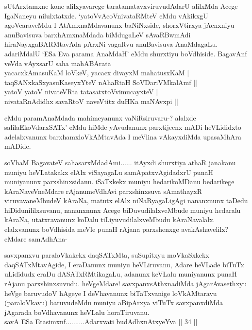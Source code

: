 \begin{artha}
sUtArxtamxne kone alilxyavarege taratamatavxviruvudAdarU alilxMda Acege IgaNaneyu nilulxtatxde. `yatoVvAcoVnivataRMteV eMdu vAkikxgU agoVcaraveMdu I AtAmxnaMdavanunx baNiNxside, shorxVtirxya jAcnxniyu anuBavisuva barxhAmxnaMdada biMdugaLeV sAvaRBwmAdi hiraNayxgaBARMtavAda pArxNi vagaRvu anuBavisuva AnaMdagaLu. adariMdalU `ESa Eva parama AnaMdaH' eMdu shurxtiyu boVdhiside. BagavAnf veVda vAyxsarU saha mahABArata\\
yacacxkAmasuKaM loVkeV, yacacx divayxM mahatusxKaM |\\
taqSANxkaSxyasuKaseyxYteV nAhaRtaH SoVDariVMkalAmf ||\\
yatoV yatoV nivateVRta tatasatxtoVvimucayxteV |\\
nivataRnAdidhx savaRtoV naveVtitx duHKa maNAvxpi ||
\end{artha}%

\begin{artha}
eMdu paramAnaMdada mahimeyanunx vaNiRsiruvaru-? alalxde salilaEkoVdarxSATx' eMdu hiMde yAvudanunx parxtijecnx mADi heVLididxto adelalxvanunx barxhamxloVkAMtavAda I meVlina vAkayxdiMda upasaMhAra mADide. 
\end{artha}

\begin{artha}
soV\s haM BagavateV sahasarxMdadAmi...... itAyxdi shurxtiya athaR janakanu muniyu heVLatakakx elAlx viSayagaLu samApatxvAgidadxrU punaH muniyanunx parxshinxsidanu. iSaTxkekx muniyu hedarikoMDanu bedarikege kAraNaveVneMdare rAjanumeVdhAvi parxshinxsuva sAmathayxR viruvavaneMbudeV kAraNa, matutx elAlx niNaRyagaLigAgi nananxnunx taDedu hiDidunililxsuvanu, nananxnunx Acege biDuvudilalxveMbude muniyu hedaralu kAraNa, utatxravanunx koDalu tiLiyuvudilalxveMbudu kAraNavalalx. elalxvanunx boVdhisida meVle punaH rAjana parxshenxge avakAshavelilx? eMdare samAdhAna-
\end{artha}

\begin{artha}
savxpanxvu paraloVkakekx daqSATxMta, suSupitxyu moVkaSxkekx daqSATxMtavAgide, I eraDanunx muniyu heVLiruvanu, Adare heVLade biTuTx uLididudx eraDu dASATxRMtikagaLu, adanunx keVLalu muniyanunx punaH rAjanu parxshinxsuvudu. heVgeMdare! savxpanxsAthxnadiMda jAgarAvasethxyu heVge baruvudoV hAgeye I deVhavanunx biTaTxvanige loVkAMtaravu (paraloVkavu) baruvudeMdu muniyu aBipArxya viTuTx savxpanxdiMda jAgarada boVdhavanunx heVLalu horaTiruvanu.\\
savA ESa Etasimxnf..........Adarxvati budAdhxnAtxyeYva || 34 ||
\end{artha}%

